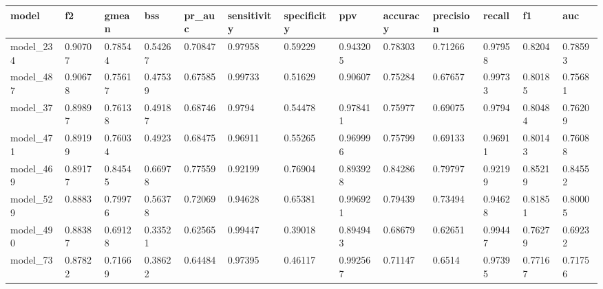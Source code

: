 \begin{tabular}{|l|l|l|l|l|l|l|l|l|l|l|l|l|}
\hline
\textbf{model} & \textbf{f2} & \textbf{gmean} & \textbf{bss} & \textbf{pr\_auc} & \textbf{sensitivity} & \textbf{specificity} & \textbf{ppv} & \textbf{accuracy} & \textbf{precision} & \textbf{recall} & \textbf{f1} & \textbf{auc} \\ \hline
model\_234     & 0.90707     & 0.78544        & 0.54267      & 0.70847          & 0.97958              & 0.59229              & 0.943205     & 0.78303           & 0.71266            & 0.97958         & 0.8204      & 0.78593      \\ \hline
model\_487     & 0.90678     & 0.75617        & 0.47539      & 0.67585          & 0.99733              & 0.51629              & 0.90607      & 0.75284           & 0.67657            & 0.99733         & 0.80185     & 0.75681      \\ \hline
model\_37      & 0.89897     & 0.76138        & 0.49187      & 0.68746          & 0.9794               & 0.54478              & 0.978411     & 0.75977           & 0.69075            & 0.9794          & 0.80484     & 0.76209      \\ \hline
model\_471     & 0.89199     & 0.76034        & 0.4923       & 0.68475          & 0.96911              & 0.55265              & 0.969996     & 0.75799           & 0.69133            & 0.96911         & 0.80143     & 0.76088      \\ \hline
model\_469     & 0.89177     & 0.84545        & 0.66978      & 0.77559          & 0.92199              & 0.76904              & 0.893928     & 0.84286           & 0.79797            & 0.92199         & 0.85219     & 0.84552      \\ \hline
model\_529     & 0.8883      & 0.79976        & 0.56378      & 0.72069          & 0.94628              & 0.65381              & 0.996921     & 0.79439           & 0.73494            & 0.94628         & 0.81851     & 0.80005      \\ \hline
model\_490     & 0.88387     & 0.69128        & 0.33521      & 0.62565          & 0.99447              & 0.39018              & 0.894943     & 0.68679           & 0.62651            & 0.99447         & 0.76279     & 0.69232      \\ \hline
model\_73      & 0.87822     & 0.71669        & 0.38622      & 0.64484          & 0.97395              & 0.46117              & 0.992567     & 0.71147           & 0.6514             & 0.97395         & 0.77167     & 0.71756      \\ \hline

\end{tabular}
